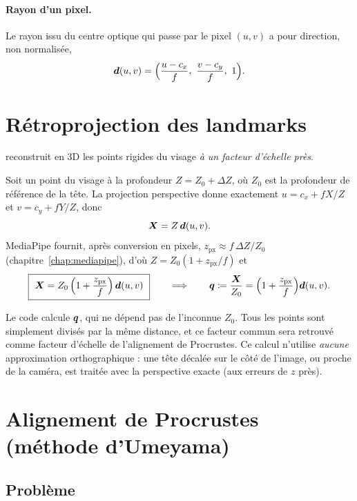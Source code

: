 \paragraph{Rayon d'un pixel.} Le rayon issu du centre optique qui passe par le pixel $(u, v)$ a pour direction, non normalisée,
\begin{equation}
  \bm{d}(u, v) = \Big(\frac{u - c_x}{f},\ \frac{v - c_y}{f},\ 1\Big).
\end{equation}

\section{Rétroprojection des landmarks}
\label{sec:retroprojection}

 reconstruit en 3D les points rigides du visage \emph{à un facteur d'échelle près}.

Soit un point du visage à la profondeur $Z = Z_0 + \Delta Z$, où $Z_0$ est la profondeur de référence de la tête. La projection perspective donne exactement $u = c_x + f X/Z$ et $v = c_y + f Y/Z$, donc
\begin{equation}
  \bm{X} = Z\,\bm{d}(u, v).
\end{equation}
MediaPipe fournit, après conversion en pixels, $z_\text{px} \approx f\,\Delta Z / Z_0$ (chapitre~\ref{chap:mediapipe}), d'où $Z = Z_0 (1 + z_\text{px}/f)$ et
\begin{equation}
  \boxed{\ \bm{X} = Z_0\,\Big(1 + \frac{z_\text{px}}{f}\Big)\,\bm{d}(u, v)\ }
  \qquad\Longrightarrow\qquad
  \bm{q} \coloneqq \frac{\bm{X}}{Z_0} = \Big(1 + \frac{z_\text{px}}{f}\Big)\bm{d}(u, v).
\end{equation}

Le code calcule $\bm{q}$, qui ne dépend pas de l'inconnue $Z_0$. Tous les points sont simplement divisés par la même distance, et ce facteur commun sera retrouvé comme facteur d'échelle de l'alignement de Procrustes. Ce calcul n'utilise \emph{aucune} approximation orthographique : une tête décalée sur le côté de l'image, ou proche de la caméra, est traitée avec la perspective exacte (aux erreurs de $z$ près).

\section{Alignement de Procrustes (méthode d'Umeyama)}
\label{sec:umeyama}

\subsection{Problème}

